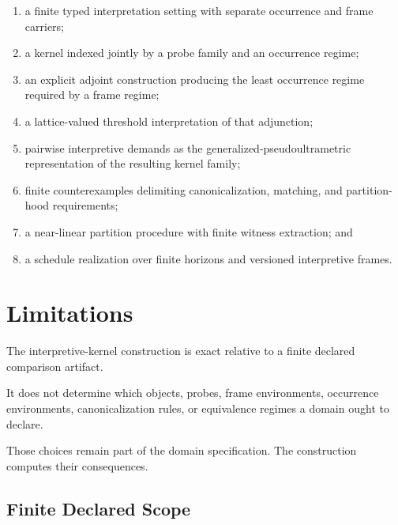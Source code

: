 \documentclass[11pt]{article}
\theoremstyle{plain}
\theoremstyle{definition}
\theoremstyle{remark}
\begin{document}
\begin{enumerate}[label=(\arabic*)]
  \item a finite typed interpretation setting
        with separate occurrence
        and frame carriers;

  \item a kernel indexed jointly
        by a probe family
        and an occurrence regime;

  \item an explicit adjoint construction
        producing the least occurrence regime
        required by a frame regime;

  \item a lattice-valued threshold interpretation
        of that adjunction;

  \item pairwise interpretive demands
        as the generalized-pseudoultrametric
        representation
        of the resulting kernel family;

  \item finite counterexamples
        delimiting canonicalization,
        matching,
        and partition-hood requirements;

  \item a near-linear partition procedure
        with finite witness extraction; and

  \item a schedule realization
        over finite horizons
        and versioned interpretive frames.
\end{enumerate}


\section{Limitations}
\label{ik.sec.limitations}

The interpretive-kernel construction is exact
relative to a finite declared comparison artifact.

It does not determine
which objects,
probes,
frame environments,
occurrence environments,
canonicalization rules,
or equivalence regimes
a domain ought to declare.

Those choices remain part
of the domain specification.
The construction computes
their consequences.

\subsection{Finite Declared Scope}
\end{document}
